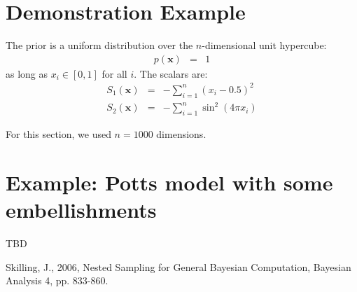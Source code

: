 \documentclass[a4paper, 11pt]{article}
\begin{document}
\section{Demonstration Example}
The prior is a uniform distribution over the $n$-dimensional unit hypercube:
\begin{eqnarray}
p(\mathbf{x}) &=& 1
\end{eqnarray}
as long as $x_i \in [0, 1]$ for all $i$. The scalars are:
\begin{eqnarray}
S_1(\mathbf{x}) &=& -\sum_{i=1}^n \left(x_i - 0.5\right)^2\\
S_2(\mathbf{x}) &=& -\sum_{i=1}^n \sin^2\left(4\pi x_i\right)
\end{eqnarray}

For this section, we used $n=1000$ dimensions.

\section{Example: Potts model with some embellishments}
TBD

\begin{thebibliography}{99}

 Skilling, J., 2006, Nested Sampling for General Bayesian Computation, Bayesian Analysis 4, pp. 833-860.

\end{thebibliography}
\end{document}
